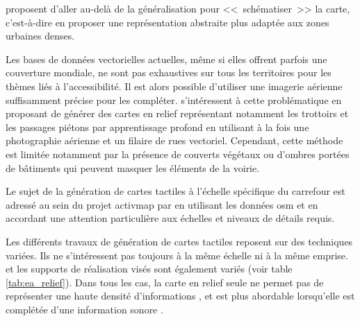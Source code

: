 \newpar{}

\citet{Touya2019} proposent d'aller au-delà de la généralisation pour <<~schématiser~>> la carte, c'est-à-dire en proposer une représentation abstraite plus adaptée aux zones urbaines denses. 

\newpar{}

Les bases de données vectorielles actuelles, même si elles offrent parfois une couverture mondiale, ne sont pas exhaustives sur tous les territoires pour les thèmes liés à l’accessibilité. Il est alors possible d'utiliser une imagerie aérienne suffisamment précise pour les compléter. \citet{FillieresRiveau2020} s'intéressent à cette problématique en proposant de générer des cartes en relief représentant notamment les trottoirs et les passages piétons par apprentissage profond en utilisant à la fois une photographie aérienne et un filaire de rues vectoriel. Cependant, cette méthode est limitée notamment par la présence de couverts végétaux ou d'ombres portées de bâtiments qui peuvent masquer les éléments de la voirie.

\newpar{}

Le sujet de la génération de cartes tactiles à l'échelle spécifique du carrefour est adressé au sein du projet \gls{activmap} par \citet{Jiang2023} en utilisant les données \gls{osm} et en accordant une attention particulière aux échelles et niveaux de détails requis.

\newpar{}

Les différents travaux de génération de cartes tactiles reposent sur des techniques variées. Ils ne s'intéressent pas toujours à la même échelle ni à la même emprise. et les supports de réalisation visés sont également variés (voir table \ref{tab:ea_relief}). Dans tous les cas, la carte en relief seule ne permet pas de représenter une haute densité d'informations \citep{Touya2019}, et est plus abordable lorsqu'elle est complétée d'une information sonore \citep{Brock2015}.

